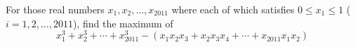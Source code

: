 For those real numbers $x_1 , x_2 , \ldots , x_{2011}$ where each of which satisfies $0 \le x_1 \le 1$ ($i = 1 , 2 , \ldots , 2011$), find the maximum of
\[ x_1^3+x_2^3+ \cdots + x_{2011}^3 - \left( x_1x_2x_3 + x_2x_3x_4 + \cdots + x_{2011}x_1x_2 \right) \]